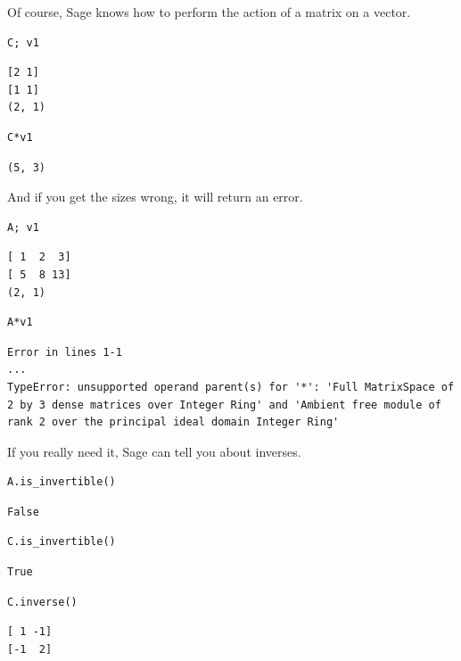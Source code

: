 \documentclass[10pt,]{book}
\theoremstyle{plain}
\numberwithin{equation}{section}
\begin{document}
        Of course, Sage knows how to perform the action of a matrix on a vector.
\begin{lstlisting}[style=sageinput]
C; v1
\end{lstlisting}
\begin{lstlisting}[style=sageoutput]
[2 1]
[1 1]
(2, 1)
\end{lstlisting}
\begin{lstlisting}[style=sageinput]
C*v1
\end{lstlisting}
\begin{lstlisting}[style=sageoutput]
(5, 3)
\end{lstlisting}
\par
And if you get the sizes wrong, it will return an error.%
\begin{lstlisting}[style=sageinput]
A; v1
\end{lstlisting}
\begin{lstlisting}[style=sageoutput]
[ 1  2  3]
[ 5  8 13]
(2, 1)
\end{lstlisting}
\begin{lstlisting}[style=sageinput]
A*v1
\end{lstlisting}
\begin{lstlisting}[style=sageoutput]
Error in lines 1-1
...
TypeError: unsupported operand parent(s) for '*': 'Full MatrixSpace of 2 by 3 dense matrices over Integer Ring' and 'Ambient free module of rank 2 over the principal ideal domain Integer Ring'
\end{lstlisting}
\par
If you really need it, Sage can tell you about inverses.%
\begin{lstlisting}[style=sageinput]
A.is_invertible()
\end{lstlisting}
\begin{lstlisting}[style=sageoutput]
False
\end{lstlisting}
\begin{lstlisting}[style=sageinput]
C.is_invertible()
\end{lstlisting}
\begin{lstlisting}[style=sageoutput]
True
\end{lstlisting}
\begin{lstlisting}[style=sageinput]
C.inverse()
\end{lstlisting}
\begin{lstlisting}[style=sageoutput]
[ 1 -1]
[-1  2]
\end{lstlisting}
\typeout{************************************************}
\typeout{************************************************}
\end{document}
